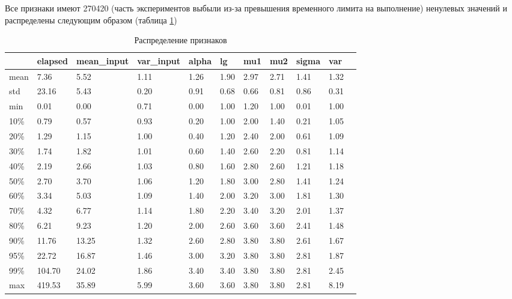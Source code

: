 Все признаки имеют 270420 (часть экспериментов выбыли из-за превышения временного лимита на выполнение) ненулевых значений и распределены следующим образом (таблица \ref{table_feature_distr})	
\begin{table}[H]
	\centering
	\caption{Распределение признаков}
	\label{table_feature_distr}
	\begin{tabular}{|l|l|l|l|l|l|l|l|l|l|l|}
		\hline
		& elapsed & mean\_input & var\_input &     alpha &        lg &       mu1 &       mu2 &     sigma &       var \\
		\hline
		mean & 7.36 &       5.52 & 1.11 &      1.26 &      1.90 &      2.97 &      2.71 &      1.41 &      1.32 \\
		\hline
		std & 23.16 &       5.43 & 0.20 &      0.91 &      0.68 &      0.66 &      0.81 &      0.86 &      0.31 \\
		\hline
		min & 0.01 &       0.00 & 0.71 &      0.00 &      1.00 &      1.20 &      1.00 &      0.01 &      1.00 \\
		\hline
		10\% & 0.79 &       0.57 & 0.93 &      0.20 &      1.00 &      2.00 &      1.40 &      0.21 &      1.05 \\
		\hline
		20\% & 1.29 &       1.15 & 1.00 &      0.40 &      1.20 &      2.40 &      2.00 &      0.61 &      1.09 \\
		\hline
		30\% & 1.74 &       1.82 & 1.01 &      0.60 &      1.40 &      2.60 &      2.20 &      0.81 &      1.14 \\
		\hline
		40\% & 2.19 &       2.66 & 1.03 &      0.80 &      1.60 &      2.80 &      2.60 &      1.21 &      1.18 \\
		\hline
		50\% & 2.70 &       3.70 & 1.06 &      1.20 &      1.80 &      3.00 &      2.80 &      1.41 &      1.24 \\
		\hline
		60\% & 3.34 &       5.03 & 1.09 &      1.40 &      2.00 &      3.20 &      3.00 &      1.81 &      1.30 \\
		\hline
		70\% & 4.32 &       6.77 & 1.14 &      1.80 &      2.20 &      3.40 &      3.20 &      2.01 &      1.37 \\
		\hline
		80\% & 6.21 &       9.23 & 1.20 &      2.00 &      2.60 &      3.60 &      3.60 &      2.41 &      1.48 \\
		\hline
		90\% & 11.76 &      13.25 & 1.32 &      2.60 &      2.80 &      3.80 &      3.80 &      2.61 &      1.67 \\
		\hline
		95\% & 22.72 &      16.87 & 1.46 &      3.00 &      3.20 &      3.80 &      3.80 &      2.81 &      1.87 \\
		\hline
		99\% & 104.70 &      24.02 & 1.86 &      3.40 &      3.40 &      3.80 &      3.80 &      2.81 &      2.45 \\
		\hline
		max & 419.53 &      35.89 & 5.99 &      3.60 &      3.60 &      3.80 &      3.80 &      2.81 &      8.19 \\
		\hline
	\end{tabular}
\end{table}
